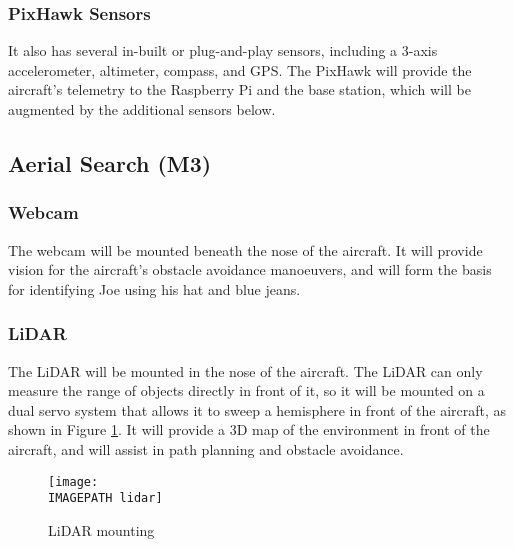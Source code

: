 \subsubsection*{PixHawk Sensors}
It also has several in-built or plug-and-play sensors, including a 3-axis accelerometer, altimeter, compass, and GPS. The PixHawk will provide the aircraft's telemetry to the Raspberry Pi and the base station, which will be augmented by the additional sensors below.

\subsection{Aerial Search (M3)}
\subsubsection*{Webcam}
The webcam will be mounted beneath the nose of the aircraft. It will provide vision for the aircraft's obstacle avoidance manoeuvers, and will form the basis for identifying Joe using his hat and blue jeans.

\subsubsection*{LiDAR}
The LiDAR will be mounted in the nose of the aircraft. The LiDAR can only measure the range of objects directly in front of it, so it will be mounted on a dual servo system that allows it to sweep a hemisphere in front of the aircraft, as shown in Figure \ref{fig:lidar}. It will provide a 3D map of the environment in front of the aircraft, and will assist in path planning and obstacle avoidance.

\begin{figure}[!ht]
	\centering
	\texttt{[image: \\IMAGEPATH lidar]}
	\caption{LiDAR mounting}
	\label{fig:lidar}
\end{figure}